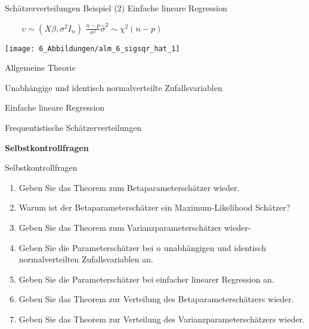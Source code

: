 \documentclass[
  8pt,
  ignorenonframetext,
]{beamer}
\providecommand{\tightlist}{%
  \setlength{\itemsep}{0pt}\setlength{\parskip}{0pt}}
\begin{document}
\begin{frame}{Schätzerverteilungen}
\protect\hypertarget{schuxe4tzerverteilungen-7}{}
Beispiel (2) Einfache lineare Regression

\vspace{4mm}
\center

\(\quad\quad \upsilon \sim (X\beta,\sigma^2I_n)\) \hspace{3cm}
\(\frac{n-p}{\sigma^2}\hat{\sigma}^2 \sim \chi^2(n-p)\)

\begin{center}\texttt{[image: 6\_Abbildungen/alm\_6\_sigsqr\_hat\_1]} \end{center}
\end{frame}

\begin{frame}{}
\protect\hypertarget{section-12}{}
\large
{}
\vfill

Allgemeine Theorie

Unabhängige und identisch normalverteilte Zufallsvariablen

Einfache lineare Regression

Frequentistische Schätzerverteilungen

\textbf{Selbstkontrollfragen} \vfill
\end{frame}

\begin{frame}{Selbstkontrollfragen}
\protect\hypertarget{selbstkontrollfragen}{}
\footnotesize
{}

\begin{enumerate}
\tightlist
\item
  Geben Sie das Theorem zum Betaparameterschätzer wieder.
\item
  Warum ist der Betaparameterschätzer ein Maximum-Likelihood Schätzer?
\item
  Geben Sie das Theorem zum Varianzparameterschätzer wieder-
\item
  Geben Sie die Parameterschätzer bei \(n\) unabhängigen und identisch
  normalverteilten Zufallsvariablen an.
\item
  Geben Sie die Parameterschätzer bei einfacher linearer Regression an.
\item
  Geben Sie das Theorem zur Verteilung des Betaparameterschätzers
  wieder.
\item
  Geben Sie das Theorem zur Verteilung des Varianzparameterschätzers
  wieder.
\end{enumerate}
\end{frame}
\end{document}
